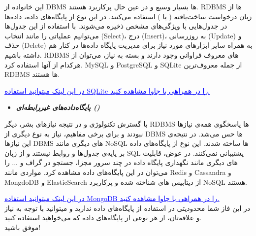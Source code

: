\documentclass[]{article}
\begin{document}
این خانواده از DBMS ها بسیار وسیع و در عین حال پرکاربرد هستند. RDBMS ها از زبان درخواست ساخت‌یافته ( یا ) استفاده می‌کنند. در این نوع از پایگاه‌های داده، داده‌ها در جدول‌هایی با ویژگی‌های مشخص ذخیره می‌شوند. با استفاده از این جدول‌ها می‌توانیم عملیاتی را مانند انتخاب (Select)، درج (Insert)، به روزرسانی (Update) و حذف (Delete) به همراه سایر ابزارهای مورد نیاز برای مدیریت پایگاه داده‌ها در کنار هم داشته باشیم. RDBMS های معروف فراوانی وجود دارند و بسته به نیاز، می‌توان از هرکدام از آنها استفاده کرد. MySQL و PostgreSQL و SQLite از جمله معروف‌ترین RDBMS ها هستند.

\href{https://www.tutorialspoint.com/sqlite/sqlite_java.htm}{\textcolor{blue}{\underline{در این لینک میتوانید استفاده SQLite را در همراهی با جاوا مشاهده کنید.}}}
\\

\begin{itemize}
\item \textbf{\emph{ پایگاه‌داده‌های غیررابطه‌ای () }}
\end{itemize}

با گسترش تکنولوژی و در نتیجه نیاز‌های بشر، دیگر RDBMS ها پاسخگوی همه‌ی نیازها نبودند و برای برخی مفاهیم، نیاز به نوع دیگری از DBMS ها حس می‌شد. در نتیجه‌ی این نیاز‌ها DBMS های دیگری مانند NoSQL ها ساخته شدند. این نوع از پایگاه‌های داده بر پایه‌ی جدول‌ها و روابط نیستند و از زبان SQL پشتیبانی نمی‌کنند. در عوض، قابلیت های دیگری مانند نگهداری پایگاه داده در چند سرور مجزا، جستجو در گراف و ... را می‌توان در این پایگاه‌های داده مشاهده کرد. مواردی مانند Redis و Cassandra و MongdoDB و ElasticSearch از دیتابیس های شناخته شده و پرکاربرد NoSQL هستند.

\href{https://www.tutorialspoint.com/mongodb/mongodb_java.htm}{\textcolor{blue}{\underline{در این لینک میتوانید استفاده MongoDB را در همراهی با جاوا مشاهده کنید.}}}
\\

در این فاز شما محدودیتی در استفاده از پایگاه‌های داده ندارید و میتوانید با توجه به نیاز و علاقه‌تان، از هر نوعی از پایگاه‌های داده که می‌خواهید استفاده کنید.
\\

موفق باشید!
\end{document}
